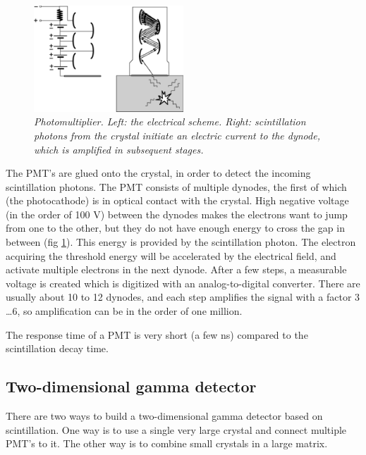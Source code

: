 \documentclass[11pt,oneside]{book}
\begin{document}
\begin{figure}[tb]
\centering
\includegraphics[width=0.5\textwidth]{figs/fig_jnpmt.pdf}
\caption{\label{fig:jnpmt} \emph{Photomultiplier. Left: the electrical scheme.
Right: scintillation photons from the crystal initiate an electric current to
the dynode, which is amplified in subsequent stages.}}
\end{figure}

The PMT's are glued onto the crystal, in order to detect the incoming
scintillation photons. The PMT consists of multiple dynodes, the first of
which (the photocathode) is in optical contact with the crystal. High negative
voltage (in the order of 100 V) between the dynodes makes the electrons want
to jump from one to the other, but they do not have enough energy to cross the
gap in between (fig \ref{fig:jnpmt}).  This energy is provided by the
scintillation photon. The electron acquiring the threshold energy will be
accelerated by the electrical field, and activate multiple electrons in the
next dynode. After a few steps, a measurable voltage is created which is
digitized with an analog-to-digital converter. There are usually about 10 to
12 dynodes, and each step amplifies the signal with a factor 3 \ldots 6, so
amplification can be in the order of one million.

The response time of a PMT is very short (a few ns) compared to the
scintillation decay time.


\subsection{Two-dimensional gamma detector}
%
There are two ways to build a two-dimensional gamma detector based on
scintillation. One way is to use a single very large crystal and connect
multiple PMT's to it. The other way is to combine small crystals in a
large matrix.
\end{document}
